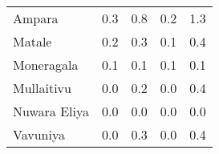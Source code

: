\begin{tabular}{lrrrr}
Ampara       &            0.3 &                 0.8 &            0.2 &                 1.3 \\
Matale       &            0.2 &                 0.3 &            0.1 &                 0.4 \\
Moneragala   &            0.1 &                 0.1 &            0.1 &                 0.1 \\
Mullaitivu   &            0.0 &                 0.2 &            0.0 &                 0.4 \\
Nuwara Eliya &            0.0 &                 0.0 &            0.0 &                 0.0 \\
Vavuniya     &            0.0 &                 0.3 &            0.0 &                 0.4 \\
\bottomrule
\end{tabular}
